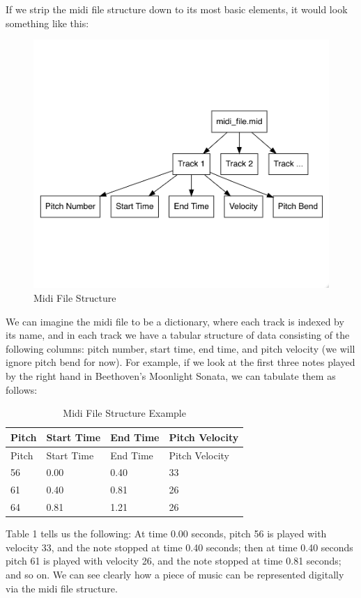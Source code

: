 \documentclass[12pt,oneside]{chicagocapstone}
\begin{document}
If we strip the midi file structure down to its most basic elements, it would look something like this:
\begin{figure}

{\centering \includegraphics[width=0.8\linewidth]{figure/midi_file_structure} 

}

\caption{Midi File Structure}\label{fig:unnamed-chunk-2}
\end{figure}
We can imagine the midi file to be a dictionary, where each track is indexed by its name, and in each track we have a tabular structure of data consisting of the following columns: pitch number, start time, end time, and pitch velocity (we will ignore pitch bend for now). For example, if we look at the first three notes played by the right hand in Beethoven's Moonlight Sonata, we can tabulate them as follows:
\begin{longtable}[]{@{}llll@{}}
\caption{Midi File Structure Example}\tabularnewline
\toprule
Pitch & Start Time & End Time & Pitch Velocity\tabularnewline
\midrule
\endfirsthead
\toprule
Pitch & Start Time & End Time & Pitch Velocity\tabularnewline
\midrule
\endhead
56 & 0.00 & 0.40 & 33\tabularnewline
61 & 0.40 & 0.81 & 26\tabularnewline
64 & 0.81 & 1.21 & 26\tabularnewline
\bottomrule
\end{longtable}
Table 1 tells us the following: At time 0.00 seconds, pitch 56 is played with velocity 33, and the note stopped at time 0.40 seconds; then at time 0.40 seconds pitch 61 is played with velocity 26, and the note stopped at time 0.81 seconds; and so on. We can see clearly how a piece of music can be represented digitally via the midi file structure.
\end{document}
